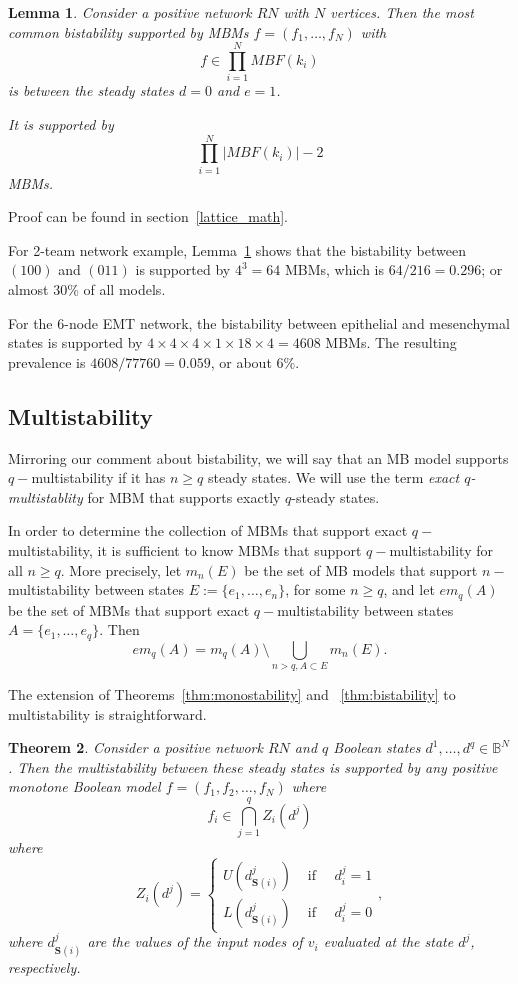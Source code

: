 \documentclass[10pt,letterpaper]{article}
\newcommand{\bbB}{\mathbb{B}}
\newcommand{\Sources}{\mathbf{S}}
\newcommand{\boolf}{{\mathfrak 0}}
\newcommand{\boolt}{{\mathfrak 1}}
\newtheorem{thm}{Theorem}[section]
\newtheorem{lem}[thm]{Lemma}
\begin{document}
\begin{lem}\label{lem:bistable_most_common}
Consider a positive network $RN$ with $N$ vertices.
Then the most common bistability supported by MBMs $f=(f_1, \ldots, f_N)$ with 
\[ f \in \prod_{i=1}^N MBF(k_i) \]
 is between the steady states $d=\boolf$ and $e=\boolt$. 

It is supported by 
\[ \prod_{i=1}^N |MBF(k_i)|-2 \]
MBMs.
\end{lem}
Proof can be found in section~\ref{lattice_math}.

For 2-team network example, Lemma~\ref{lem:bistable_most_common} shows that the bistability between $(100)$ and $(011)$ is supported by 
$4^3 = 64 $ MBMs, which is $64/216=0.296$; or  almost $ 30\%$ of all models. 

For the 6-node EMT network, the bistability between epithelial and mesenchymal states is supported by 
$4\times4\times4\times1\times18\times4 = 4608$ MBMs. The resulting  prevalence is $4608/77760=0.059$, or about $6\%$.

\subsection{Multistability} \label{sec:multi}


Mirroring our comment about bistability, we will say that an MB model supports $q-$multistability if it has $n \geq q$ steady states. We will use the term \textit{ exact $q$-multistablity} for MBM that supports exactly $q$-steady states. 

In order to determine the collection of MBMs that support exact $q-$multistability, it is sufficient to know MBMs that support $q-$multistability for all $n \geq q$. More precisely, let $m_n(E)$ be the set of MB models that support $n-$multistability between states $E:=\{e_1, \ldots, e_n\}$, for some $n \geq q$, and let $em_q(A)$ be the set of MBMs that support exact $q-$multistability between states $A=\{e_1, \ldots, e_q\}$. Then 
\[ em_q(A) = m_q(A) \setminus \bigcup_{n>q, A \subset E} m_n(E).\]



The extension of Theorems~\ref{thm:monostability} and ~\ref{thm:bistability} to multistability is straightforward.

\begin{thm}\label{thm:multistability}
Consider a positive network $RN$ and $q$ Boolean states $d^1,\ldots, d^q \in \bbB^N$.
Then the multistability between these steady states is supported by any positive monotone Boolean model $f=(f_1,f_2, \ldots, f_N)$ where
\[ f_i \in \bigcap_{j=1}^q Z_i(d^j)\]
where 
\[ Z_i(d^j)= \left\{ \begin{array}{cc}
U(d^j_{\Sources(i)}) & \mbox{ if } \quad  d^j_i=1\\
L(d^j_{\Sources(i)}) &\mbox{ if } \quad  d^j_i=0
\end{array}
\right . ,
\]
where $d^j_{\Sources(i)}$ are the values of the input nodes of $v_i$ evaluated at the state $d^j$, respectively.
\end{thm}
\end{document}
